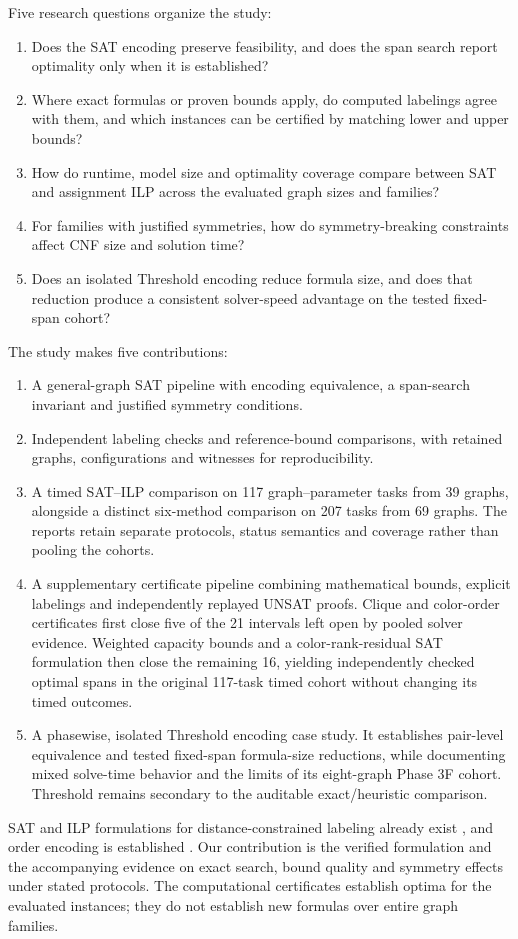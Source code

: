Five research questions organize the study:
\begin{enumerate}
\item\label{rq:correctness} Does the SAT encoding preserve feasibility,
and does the span search report optimality only when it is established?
\item\label{rq:theory} Where exact formulas or proven bounds apply, do
computed labelings agree with them, and which instances can be certified
by matching lower and upper bounds?
\item\label{rq:comparison} How do runtime, model size and optimality
coverage compare between SAT and assignment ILP across the evaluated
graph sizes and families?
\item\label{rq:symmetry} For families with justified symmetries, how do
symmetry-breaking constraints affect CNF size and solution time?
\item\label{rq:threshold} Does an isolated Threshold encoding reduce
formula size, and does that reduction produce a consistent solver-speed
advantage on the tested fixed-span cohort?
\end{enumerate}

The study makes five contributions:
\begin{enumerate}
\item A general-graph SAT pipeline with encoding equivalence, a
span-search invariant and justified symmetry conditions.
\item Independent labeling checks and reference-bound comparisons,
with retained graphs, configurations and witnesses for reproducibility.
\item A timed SAT--ILP comparison on 117 graph--parameter tasks from 39
graphs, alongside a distinct six-method comparison on 207 tasks from 69
graphs. The reports retain separate protocols, status semantics and
coverage rather than pooling the cohorts.
\item A supplementary certificate pipeline combining mathematical
bounds, explicit labelings and independently replayed UNSAT proofs.
Clique and color-order certificates first close five of the 21 intervals
left open by pooled solver evidence. Weighted capacity bounds and a
color-rank-residual SAT formulation then close the remaining 16, yielding
independently checked optimal spans in the original 117-task timed cohort
without changing its timed outcomes.
\item A phasewise, isolated Threshold encoding case study. It establishes
pair-level equivalence and tested fixed-span formula-size reductions,
while documenting mixed solve-time behavior and the limits of its
eight-graph Phase 3F cohort. Threshold remains secondary to the
auditable exact/heuristic comparison.
\end{enumerate}

SAT and ILP formulations for distance-constrained labeling already exist
\cite{shao2013distance,shao2014strong}, and order encoding is established
\cite{tamura2009order}. Our contribution is the verified formulation and
the accompanying evidence on exact search, bound quality and symmetry
effects under stated protocols. The computational certificates establish
optima for the evaluated instances; they do not establish new formulas
over entire graph families.
